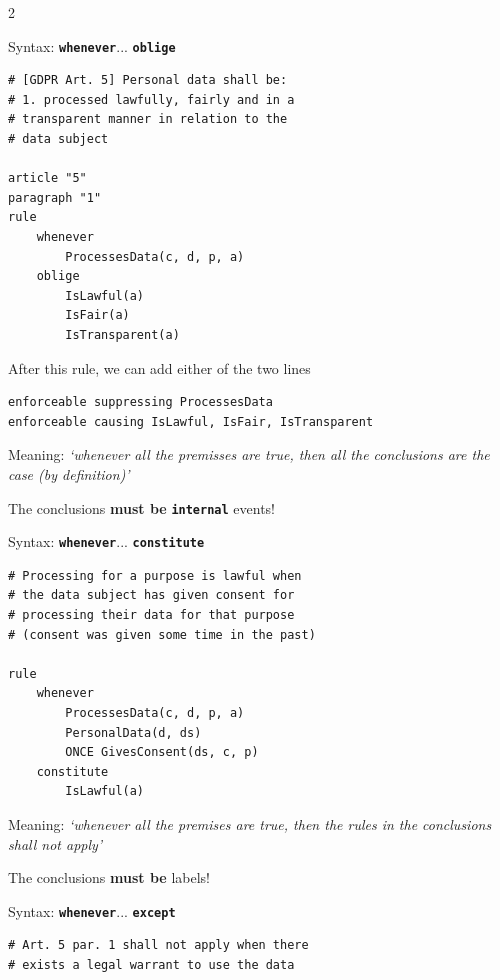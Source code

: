 \documentclass[a4paper,9pt]{extarticle}
\newcommand{\kw}[1]{{\color{magenta}\texttt{\bfseries\upshape #1}}}
\begin{document}
\begin{multicols}{2}
\begin{tcolorbox}[title={\bfseries 6 \quad Rules}, colframe=blue!75!black, left=1pt, right=1pt, top=0pt, bottom=0pt]
\begin{tcolorbox}[title=6.1 Obligation rules, left=1pt, right=1pt]
        Syntax: \kw{whenever}... \kw{oblige}

\begin{lstlisting}
# [GDPR Art. 5] Personal data shall be:
# 1. processed lawfully, fairly and in a
# transparent manner in relation to the
# data subject

article "5"
paragraph "1"
rule
    whenever
        ProcessesData(c, d, p, a)
    oblige
        IsLawful(a)
        IsFair(a)
        IsTransparent(a)
\end{lstlisting}

        After this rule, we can add either of the two lines
\begin{lstlisting}
enforceable suppressing ProcessesData
enforceable causing IsLawful, IsFair, IsTransparent    
\end{lstlisting}
        \vspace{-1em}
      \end{tcolorbox}

      \begin{tcolorbox}[title=6.2 Constitutive rules, left=1pt, right=1pt]
        Meaning: \emph{`whenever all the premisses are true, then all the conclusions are the case (by definition)'}

        The conclusions \textbf{must be} \kw{internal} events!

        Syntax: \kw{whenever}... \kw{constitute}

\begin{lstlisting}
# Processing for a purpose is lawful when
# the data subject has given consent for
# processing their data for that purpose
# (consent was given some time in the past)

rule
    whenever
        ProcessesData(c, d, p, a)
        PersonalData(d, ds)
        ONCE GivesConsent(ds, c, p)
    constitute
        IsLawful(a)
\end{lstlisting}
        \vspace{-1em}
      \end{tcolorbox}

      \begin{tcolorbox}[title=6.3 Exception rules, left=1pt, right=1pt]
        Meaning: \emph{`whenever all the premises are true, then the rules in the conclusions shall not apply'}

        The conclusions \textbf{must be} labels!

        Syntax: \kw{whenever}... \kw{except}

\begin{lstlisting}
# Art. 5 par. 1 shall not apply when there
# exists a legal warrant to use the data


\end{lstlisting}
\end{tcolorbox}
\end{tcolorbox}
\end{multicols}
\end{document}
